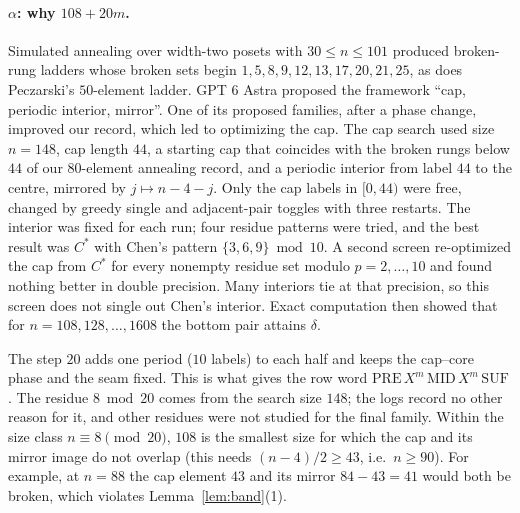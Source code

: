 \documentclass[11pt]{amsart}
\theoremstyle{definition}
\theoremstyle{remark}
\begin{document}
\paragraph{$\alpha$: why $108+20m$.} Simulated annealing over width-two posets with $30\le n\le101$ produced broken-rung ladders whose broken sets begin $1,5,8,9,12,13,17,20,21,25$, as does Peczarski's $50$-element ladder. GPT 6 Astra proposed the framework ``cap, periodic interior, mirror''. One of its proposed families, after a phase change, improved our record, which led to optimizing the cap. The cap search used size $n=148$, cap length $44$, a starting cap that coincides with the broken rungs below $44$ of our $80$-element annealing record, and a periodic interior from label $44$ to the centre, mirrored by $j\mapsto n-4-j$. Only the cap labels in $[0,44)$ were free, changed by greedy single and adjacent-pair toggles with three restarts. The interior was fixed for each run; four residue patterns were tried, and the best result was $C^*$ with Chen's pattern $\{3,6,9\}\bmod10$. A second screen re-optimized the cap from $C^*$ for every nonempty residue set modulo $p=2,\dots,10$ and found nothing better in double precision. Many interiors tie at that precision, so this screen does not single out Chen's interior. Exact computation then showed that for $n=108,128,\dots,1608$ the bottom pair attains $\delta$.

The step $20$ adds one period ($10$ labels) to each half and keeps the cap--core phase and the seam fixed. This is what gives the row word $\mathrm{PRE}\,X^m\,\mathrm{MID}\,X^m\,\mathrm{SUF}$. The residue $8\bmod 20$ comes from the search size $148$; the logs record no other reason for it, and other residues were not studied for the final family. Within the size class $n\equiv8\pmod{20}$, $108$ is the smallest size for which the cap and its mirror image do not overlap (this needs $(n-4)/2\ge43$, i.e.\ $n\ge90$). For example, at $n=88$ the cap element $43$ and its mirror $84-43=41$ would both be broken, which violates Lemma~\ref{lem:band}(1).
\end{document}

